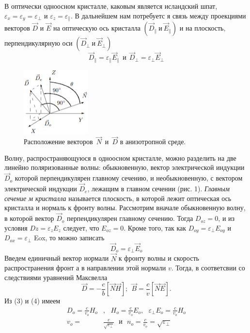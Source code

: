 \documentclass[journal, a4paper]{IEEEtran}
\begin{document}
В оптически одноосном кристалле,
каковым является исландский
шпат, $\varepsilon_x=\varepsilon_y=\varepsilon_{\perp}$ и
$\varepsilon_z=\varepsilon_{\|}$. В дальнейшем нам потребуетс
я связь между проекциями
векторов
$\vec D$ и
$\vec E$ на оптическую ось кристалла $(\vec D_{\|}~\text{и}~\vec E_{\|})$	 и на плоскость,
перпендикулярную оси $(\vec D_{\perp}~\text{и}~\vec E_{\perp})$	
\begin{equation}\label{}
\overrightarrow{D}_{\|}=\varepsilon_{\|}\overrightarrow{E}_{\|}~~
\text{и} ~~
 \overrightarrow {D}_{\perp}= \varepsilon_{\perp}\overrightarrow{E}_{\perp}
\end{equation}
\begin{figure}
\includegraphics[width=3.5cm]{fig1}
\caption{Расположение векторов~$\vec{N}$~и~$\vec{D}$  в анизотропной среде.}
\end{figure}Волну, распространяющуюся
в одноосном кристалле, можно разделить на две линейно
поляризованные волны: обыкновенную, вектор электрической
индукции
$\vec{D}_o$ которой перпендикулярен главному сечению,
и необыкновенную, с вектором
электрической индукции
$\vec{D}_e$, лежащим в главном сечении (рис. 1).
\textit{Главным сечение
м кристалла}
называется плоскость, в которой
лежит оптическая ось кристалла
и нормаль
к фронту волны.
Рассмотрим вначале обыкновенную волну, в которой вектор
$\vec{D}_o$ перпендикулярен главному сечению.
Тогда
$D_{oz}
= 0$, и из
условия
$Dz = \varepsilon_zE_z$ следует, что
$E_{oz}
= 0.$ Кроме того, так как
$D_{oy}
= \varepsilon_\perp
E_{oy}$
и
$D_{ox}
= \varepsilon_\perp$
Eox, то можно записать
\begin{equation}
\vec D_{o}
= \varepsilon_\perp \vec{E}_o
\end{equation}Введем единичный вектор нормали
$\vec{N}$ к фронту волны
и скорость распространения фронт
а в направлении этой нормали $v$. Тогда, в соответсвии со следствиями  уравнений Максвелла 
\begin{equation}
\vec{D}=-\frac{c}{b}\left[\vec{N}\vec{H}\right];~~
\vec{B}=\frac{c}{v}\left[\vec{N}\vec{E}\right].
\end{equation}
Из (3) и (4) имеем
\[
\begin{aligned}
D_o = \frac{c}{v_o}H_o&,~~~ H_o=\frac{c}{v_o}E_o ,~~~
\varepsilon_\perp E_o=\frac{c}{v_o}H_o\\
v_o=&\frac{c}{\sqrt{\varepsilon_{\perp}}} ~~~\text{и}~~~ n_o = \frac{c}{v_o}=\sqrt{\varepsilon_{\perp}}
\end{aligned}
\]
\end{document}
